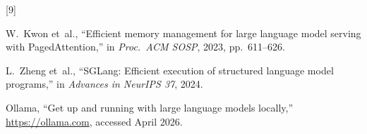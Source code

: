 \documentclass[10pt,a4paper]{article}
\begin{document}
\newpage

{\small
\begin{thebibliography}{[9]}
\setlength{\itemsep}{4pt}
\setlength{\parsep}{0pt}

W.~Kwon et~al., ``Efficient memory management for large language model serving with
PagedAttention,'' in \textit{Proc.\ ACM SOSP}, 2023, pp.~611--626.

L.~Zheng et~al., ``SGLang: Efficient execution of structured language model programs,''
in \textit{Advances in NeurIPS 37}, 2024.

Ollama, ``Get up and running with large language models locally,''
\url{https://ollama.com}, accessed April 2026.

\end{thebibliography}
}
\end{document}
